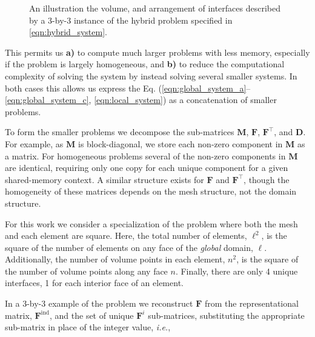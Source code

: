 %
%
%
\begin{figure}
	\centering
	
	\caption{An illustration the volume, and arrangement of interfaces described by a 3-by-3 instance of the hybrid problem specified in \eqref{eqn:hybrid_system}.}
	\label{fig:volume_diagram}
\end{figure}

%
%
%
\noindent
This permits us \textbf{a)} to compute much larger problems with less memory, especially if the problem is largely homogeneous, and \textbf{b)} to reduce the computational complexity of solving the system by instead solving several smaller systems. 
In both cases this allows us express the Eq. (\ref{eqn:global_system_a}--\ref{eqn:global_system_c}, \ref{eqn:local_system}) as a concatenation of smaller problems. 

%
%
%
To form the smaller problems we decompose the sub-matrices $\textbf{M}$, $\textbf{F}$, $\textbf{F}^{\intercal}$, and $\textbf{D}$. 
For example, as $\textbf{M}$ is block-diagonal, we store each non-zero component in $\textbf{M}$ as a matrix. 
For homogeneous problems several of the non-zero components in $\textbf{M}$ are identical, requiring only one copy for each unique component for a given shared-memory context.
A similar structure exists for $\textbf{F}$ and $\textbf{F}^{\intercal}$, though the homogeneity of these matrices depends on the mesh structure, not the domain structure. \\

%
%
%
\begin{aside}
    For this work we consider a specialization of the problem where both the mesh and each element are square. 
    Here, the total number of elements, $\ell^2$, is the square of the number of elements on any face of the \emph{global} domain, $\ell$. 
    Additionally, the number of volume points in each element, $n^2$, is the square of the number of volume points along any face $n$. 
    Finally, there are only 4 unique interfaces, 1 for each interior face of an element.
\end{aside}

%
%
%
\noindent
In a 3-by-3 example of the problem we reconstruct $\textbf{F}$ from the representational matrix, $\textbf{F}^{\text{ind}}$, and the set of unique $\textbf{F}^{i}$ sub-matrices, substituting the appropriate sub-matrix in place of the integer value, \emph{i.e.},

